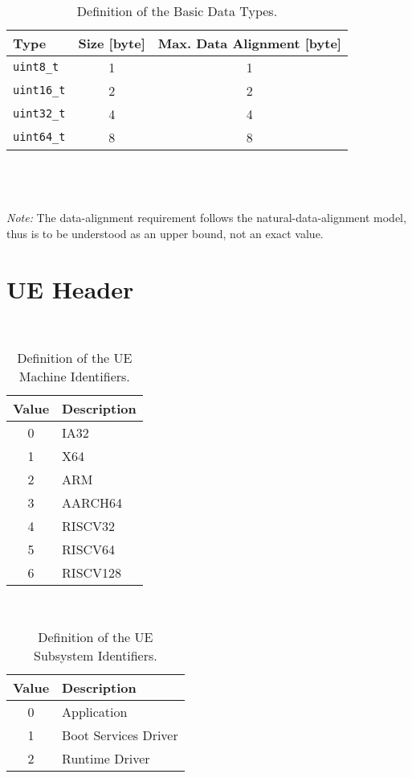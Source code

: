 \begin{table}[!htb]
  \centering
  \caption{Definition of the Basic Data Types.}
  \hfill\\
  \begin{tabular}{l c c}
    \toprule
    \textbf{Type} & \textbf{Size} [\gls{byte}] & \textbf{Max. Data Alignment} [\gls{byte}]\\
    \midrule
    \lstinline|uint8_t| & 1 & 1\\
    \lstinline|uint16_t| & 2 & 2\\
    \lstinline|uint32_t| & 4 & 4\\
    \lstinline|uint64_t| & 8 & 8\\
    \bottomrule
  \end{tabular}\\
  \hfill\\
  \hfill\\
  \emph{Note:} The \gls{data-alignment} requirement follows the \gls{natural-data-alignment} model, thus is to be understood as an upper bound, not an exact value.
\end{table}

\FloatBarrier
\section{UE Header}

\begin{table}[!htb]
  \centering
  \caption{Definition of the UE Machine Identifiers.}
  \hfill\\
  \begin{tabular}{c l}
    \toprule
    \textbf{Value} & \textbf{Description}\\
    \midrule
    0 & IA32\\
    1 & X64\\
    2 & ARM\\
    3 & AARCH64\\
    4 & RISCV32\\
    5 & RISCV64\\
    6 & RISCV128\\
    \bottomrule
  \end{tabular}
\end{table}

\begin{table}[!htb]
  \centering
  \caption{Definition of the UE Subsystem Identifiers.}
  \hfill\\
  \begin{tabular}{c l}
    \toprule
    \textbf{Value} & \textbf{Description}\\
    \midrule
    0 & Application\\
    1 & Boot Services Driver\\
    2 & Runtime Driver\\
    \bottomrule
  \end{tabular}
\end{table}


